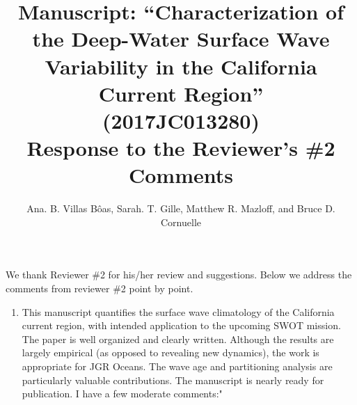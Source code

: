 \documentclass{article}
\title{
Manuscript: ``Characterization of the Deep-Water Surface Wave Variability 
in the California Current Region'' 
\\ (2017JC013280) \\ \vspace{.5cm}Response to the Reviewer's \#2 Comments}
\author{Ana. B. Villas B\^oas, Sarah. T. Gille, Matthew R. Mazloff, and  Bruce D. Cornuelle}
\begin{document}
\maketitle

{\color{blue}
We thank Reviewer \#2 for his/her review and suggestions. Below we address the comments from reviewer \#2 point by point.
}

\begin{enumerate}
\item
This manuscript quantifies the surface wave climatology of the California current region, with intended application to the upcoming SWOT mission. The paper is well organized and clearly written. Although the results are largely empirical (as opposed to revealing new dynamics), the work is appropriate for JGR Oceans. The wave age and partitioning analysis are particularly valuable contributions. The manuscript is nearly ready for publication. I have a few moderate comments:"


\end{enumerate}
\end{document}
